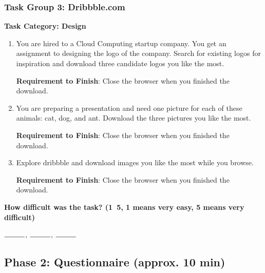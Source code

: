 \subsubsection{Task Group 3: Dribbble.com}

\textbf{Task Category: Design}

\begin{enumerate}
    \item You are hired to a Cloud Computing startup company. You get an assignment to 
    designing the logo of the company. Search for existing logos for inspiration and 
    download three candidate logos you like the most.

    \textbf{Requirement to Finish}: Close the browser when you finished the download.

    \item You are preparing a presentation and need one picture for each of these animals: 
    cat, dog, and ant. Download the three pictures you like the most.

    \textbf{Requirement to Finish}: Close the browser when you finished the download.

    \item Explore dribbble and download images you like the most while you browse.
    
    \textbf{Requirement to Finish}: Close the browser when you finished the download.

\end{enumerate}

\textbf{How difficult was the task? (1~5, 1 means very easy, 5 means very difficult)}

$\rule{1cm}{0.15mm}$, $\rule{1cm}{0.15mm}$, $\rule{1cm}{0.15mm}$

\subsection{Phase 2: Questionnaire (approx. 10 min)}

